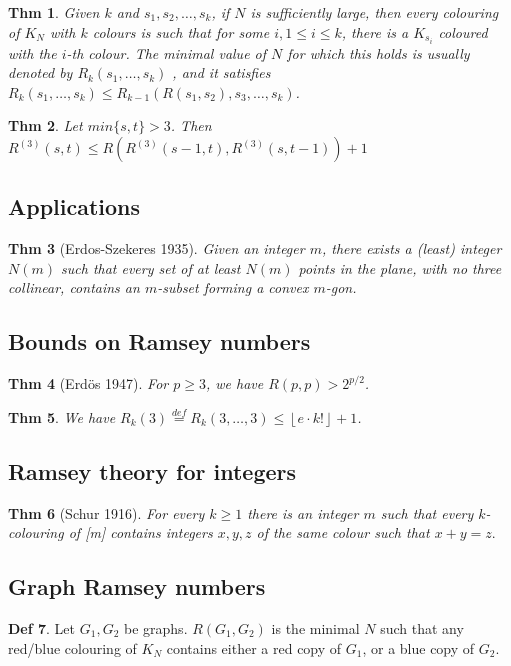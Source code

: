 \documentclass[11pt, fleqn, a4paper, landscape]{article}
\theoremstyle{plain} %
\newtheorem{thm}{Thm}
\theoremstyle{remark} %
\theoremstyle{definition} %
\newtheorem{defi}[thm]{Def}
\begin{document}
\begin{multicols}{5}
\begin{thm}
Given $k$ and $s_1, s_2, \dots , s_k$, if $N$ is sufficiently large, then every colouring of $K_N$ with $k$ colours is such that for some $i, 1 \le i \le k$, there is a $K_{s_i}$ coloured with the $i$-th colour. The
minimal value of $N$ for which this holds is usually denoted by $R_k(s_1, \dots , s_k)$ , and it satisfies $R_k(s_1, \dots , s_k)\le R_{k-1}(R(s_1, s_2), s_3, \dots , s_k)$.
\end{thm}

\begin{thm}
Let $min\{s, t\} > 3$. Then
$R^{(3)}(s, t) \le R(R^{(3)}(s - 1, t),R^{(3)}(s, t - 1)) + 1$
\end{thm}

\subsection{Applications}

\begin{thm}[Erdos-Szekeres 1935]
Given an integer $m$, there exists a (least) integer $N(m)$ such
that every set of at least $N(m)$ points in the plane, with no three collinear, contains an $m$-subset forming a convex $m$-gon.
\end{thm}
\subsection{Bounds on Ramsey numbers}

\begin{thm}[Erdös 1947]
For $p \ge 3$, we have $R(p, p) > 2^{p/2}$.
\end{thm}

\begin{thm}
We have $R_k(3)\stackrel{def}{=}R_k(3,\dots,3)\le\left\lfloor e\cdot k!\right\rfloor+1$.
\end{thm}

\subsection{Ramsey theory for integers}

\begin{thm}[Schur 1916]
For every $k \ge 1$ there is an integer $m$ such that every $k$-colouring of [m] contains integers $x, y, z$ of the same colour such that $x + y = z.$
\end{thm}

\subsection{Graph Ramsey numbers}
\begin{defi}
Let $G_1,G_2$ be graphs. $R(G_1,G_2)$ is the minimal $N$ such that any red/blue colouring of $K_N$ contains either a red copy of $G_1$, or a blue copy of $G_2$.
\end{defi}


\end{multicols}
\end{document}

